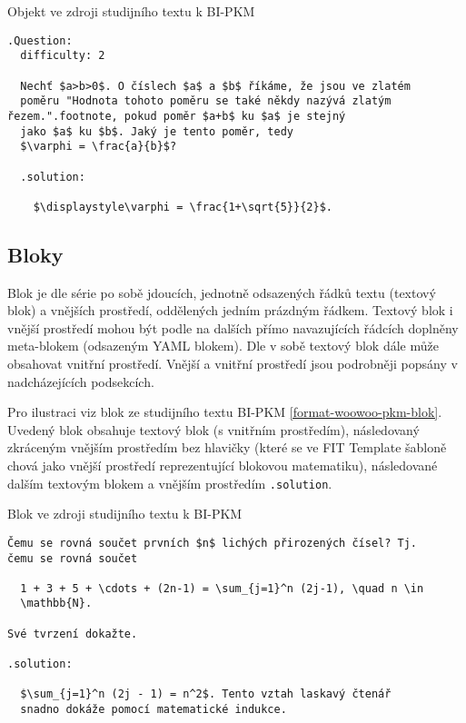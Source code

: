 \begin{listing}
    \caption{Objekt ve zdroji studijního textu k BI-PKM \cite{pkm}}
    \label{format-woowoo-pkm-otazka}
    \begin{verbatim}
.Question:
  difficulty: 2

  Nechť $a>b>0$. O číslech $a$ a $b$ říkáme, že jsou ve zlatém
  poměru "Hodnota tohoto poměru se také někdy nazývá zlatým řezem.".footnote, pokud poměr $a+b$ ku $a$ je stejný
  jako $a$ ku $b$. Jaký je tento poměr, tedy
  $\varphi = \frac{a}{b}$?

  .solution:

    $\displaystyle\varphi = \frac{1+\sqrt{5}}{2}$.
    \end{verbatim}
\end{listing}

\subsection{Bloky}

Blok je dle \cite{woowoo} série po sobě jdoucích, jednotně odsazených řádků textu (textový blok) a vnějších prostředí,
oddělených jedním prázdným řádkem. Textový blok i vnější prostředí mohou být podle \cite{woowoo} na dalších přímo
navazujících řádcích doplněny meta-blokem (odsazeným YAML blokem). Dle \cite{woowoo} v sobě textový blok dále může
obsahovat vnitřní prostředí. Vnější a vnitřní prostředí jsou podrobněji popsány v nadcházejících podsekcích.

Pro ilustraci viz blok ze studijního textu BI-PKM \ref{format-woowoo-pkm-blok}. Uvedený blok obsahuje textový blok (s
vnitřním prostředím), následovaný zkráceným vnějším prostředím bez hlavičky (které se ve FIT Template šabloně chová jako
vnější prostředí reprezentující blokovou matematiku), následované dalším textovým blokem a vnějším prostředím
\texttt{.solution}.

\begin{listing}
    \caption{Blok ve zdroji studijního textu k BI-PKM \cite{pkm}}
    \label{format-woowoo-pkm-blok}
    \begin{verbatim}
Čemu se rovná součet prvních $n$ lichých přirozených čísel? Tj.
čemu se rovná součet

  1 + 3 + 5 + \cdots + (2n-1) = \sum_{j=1}^n (2j-1), \quad n \in
  \mathbb{N}.

Své tvrzení dokažte.

.solution:

  $\sum_{j=1}^n (2j - 1) = n^2$. Tento vztah laskavý čtenář
  snadno dokáže pomocí matematické indukce.
    \end{verbatim}
\end{listing}


